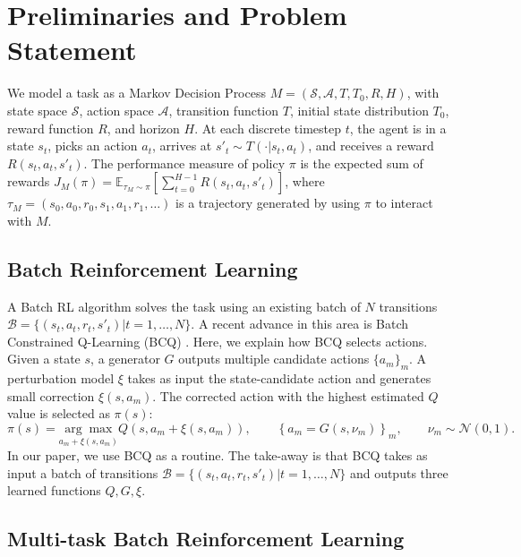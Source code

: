 \section{Preliminaries and Problem Statement}
\label{sec_prelim}

We model a task as a Markov Decision Process $M = (\mathcal{S}, \mathcal{A}, T, T_0, R, H)$, with state space $\mathcal{S}$, action space $\mathcal{A}$, transition function $T$, initial state distribution $T_0$, reward function $R$, and horizon $H$. At each discrete timestep $t$, the agent is in a state $s_t$, picks an action $a_t$, arrives at $s'_t\sim T(\cdot|s_t, a_t)$, and receives a reward $R(s_t, a_t, s'_t)$. The performance measure of policy $\pi$ is the expected sum of rewards $J_M(\pi) = \mathbb{E}_{\tau_M \sim \pi}[\sum_{t=0}^{H-1} R(s_t, a_t, s'_t)]$, where $\tau_M = (s_0, a_0, r_0, s_1, a_1, r_1, \ldots)$ is a trajectory generated by using $\pi$ to interact with $M$.


\subsection{Batch Reinforcement Learning}
\label{BCQ}

A Batch RL algorithm solves the task using an existing batch of $N$ transitions $\mathcal{B} = \{(s_{t}, a_{t}, r_{t}, s'_{t}) | t = 1, \ldots, N\}$. A recent advance in this area is Batch Constrained Q-Learning (BCQ) \cite{fujimoto2019off}. Here, we explain how BCQ selects actions. Given a state $s$, a generator $G$ outputs multiple candidate actions $\{a_m\}_{m}$. A perturbation model $\xi$ takes as input the state-candidate action and generates small correction $\xi(s, a_m)$. The corrected action with the highest estimated $Q$ value is selected as $\pi\left(s\right)$:
\begin{equation}
    \pi\left(s\right)=\underset{a_{m}+\xi\left(s, a_{m}\right)}{\arg \max } Q\left(s, a_{m}+\xi\left(s, a_{m}\right)\right), \quad \quad\left\{a_{m}=G\left(s, \nu_{m}\right)\right\}_{m}, \quad \quad \nu_{m} \sim \mathcal{N}(0,1).
\end{equation}
In our paper, we use BCQ as a routine. The take-away is that BCQ takes as input a batch of transitions $\mathcal{B} = \{(s_{t}, a_{t}, r_{t}, s'_{t}) | t = 1, \ldots, N\}$ and outputs three learned functions $Q, G, \xi$.

\subsection{Multi-task Batch Reinforcement Learning}
\label{bg_mtbrl}

